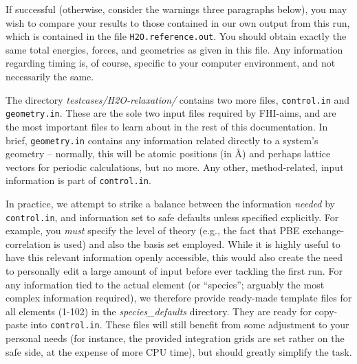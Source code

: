 If successful (otherwise, consider the warnings three paragraphs below), you
may wish to compare your results to those contained in our 
own output from this run, which is contained in the file
\texttt{H2O.reference.out}. You should obtain exactly the same total energies,
forces, and geometries as given in this file. Any information regarding timing
is, of course, specific to your computer environment, and not necessarily the
same. 

The directory \emph{testcases/H2O-relaxation/} contains two more files,
\texttt{control.in} and \linebreak[4] \texttt{geometry.in}. These are the sole two input
files required by FHI-aims, and are the most important files to learn about in
the rest of this documentation. In brief, \texttt{geometry.in} contains any
information related directly to a system's geometry -- normally, this will be
atomic positions (in \AA) and perhaps lattice vectors for periodic
calculations, but no more. Any other, method-related, input information is
part of \texttt{control.in}. 

In practice, we attempt to strike a balance
between the information \emph{needed} by \linebreak[4] \texttt{control.in}, and information
set to safe defaults unless specified explicitly. For example, you \emph{must}
specify the level of theory (e.g., the fact that PBE exchange-correlation is
used) and also the basis set employed. While it is highly useful to
have this relevant information openly accessible, this  
would also create the need to personally edit a large amount of input before ever
tackling the first run. For any information tied to the actual element (or
``species''; arguably the most complex information required), we therefore provide
ready-made template files for all elements (1-102) in the
\emph{species\_defaults} directory. They are ready for copy-paste into
\texttt{control.in}. These files will still benefit from some
adjustment to your personal needs (for instance, the provided integration
grids are set rather on the safe side, at the expense of more CPU time), but
should greatly simplify the task. 

